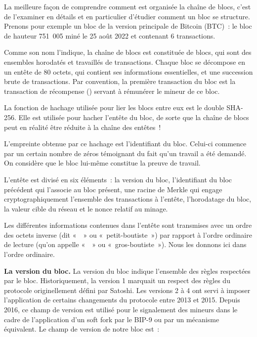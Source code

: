 La meilleure façon de comprendre comment est organisée la chaîne de blocs, c'est de l'examiner en détails et en particulier d'étudier comment un bloc se structure. Prenons pour exemple un bloc de la version principale de Bitcoin (BTC)~: le bloc de hauteur 751~005 miné le 25 août 2022 et contenant 6 transactions.



Comme son nom l'indique, la chaîne de blocs est constituée de blocs, qui sont des ensembles horodatés et travaillés de transactions. Chaque bloc se décompose en un entête de 80 octets, qui contient ses informations essentielles, et une succession brute de transactions. Par convention, la première transaction du bloc est la transaction de récompense () servant à rémunérer le mineur de ce bloc.

La fonction de hachage utilisée pour lier les blocs entre eux est le double SHA-256. Elle est utilisée pour hacher l'entête du bloc, de sorte que la chaîne de blocs peut en réalité être réduite à la chaîne des entêtes~!

L'empreinte obtenue par ce hachage est l'identifiant du bloc. Celui-ci commence par un certain nombre de zéros témoignant du fait qu'un travail a été demandé. On considère que le bloc lui-même constitue la preuve de travail. %

L'entête est divisé en six éléments~: la version du bloc, l'identifiant du bloc précédent qui l'associe au bloc présent, une racine de Merkle qui engage cryptographiquement l'ensemble des transactions à l'entête, l'horodatage du bloc, la valeur cible du réseau et le nonce relatif au minage.

Les différentes informations contenues dans l'entête sont transmises avec un ordre des octets inverse (dit «~~» ou «~petit-boutiste~») par rapport à l'ordre ordinaire de lecture (qu'on appelle «~~» ou «~gros-boutiste~»). Nous les donnons ici dans l'ordre ordinaire.


\textbf{La version du bloc.} La version du bloc indique l'ensemble des règles respectées par le bloc. Historiquement, la version 1 marquait un respect des règles du protocole originellement défini par Satoshi. Les versions 2 à 4 ont servi à imposer l'application de certains changements du protocole entre 2013 et 2015. Depuis 2016, ce champ de version est utilisé pour le signalement des mineurs dans le cadre de l'application d'un soft fork par le BIP-9 ou par un mécanisme équivalent. Le champ de version de notre bloc est~:

